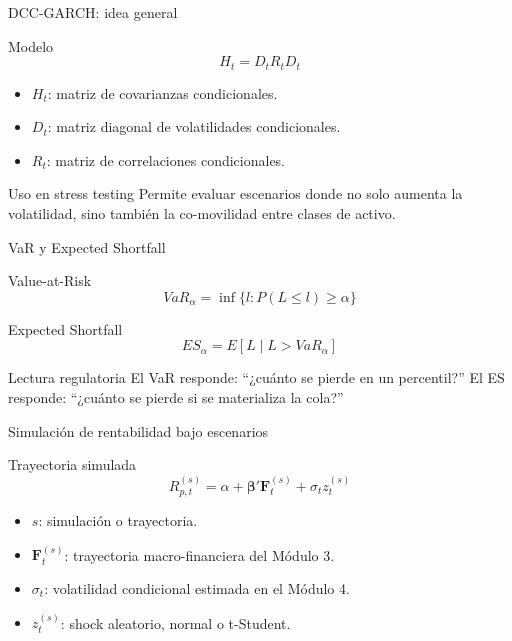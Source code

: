 \documentclass[aspectratio=169,11pt]{beamer}
\begin{document}
\begin{frame}{DCC-GARCH: idea general}
\begin{block}{Modelo}
\[
H_t=D_t R_t D_t
\]
\end{block}

\begin{itemize}
  \item $H_t$: matriz de covarianzas condicionales.
  \item $D_t$: matriz diagonal de volatilidades condicionales.
  \item $R_t$: matriz de correlaciones condicionales.
\end{itemize}

\begin{block}{Uso en stress testing}
Permite evaluar escenarios donde no solo aumenta la volatilidad, sino también la co-movilidad entre clases de activo.
\end{block}
\end{frame}

\begin{frame}{VaR y Expected Shortfall}
\begin{block}{Value-at-Risk}
\[
VaR_{\alpha}=\inf\{l: P(L\leq l)\geq \alpha\}
\]
\end{block}

\begin{block}{Expected Shortfall}
\[
ES_{\alpha}=E[L \mid L>VaR_{\alpha}]
\]
\end{block}

\begin{alertblock}{Lectura regulatoria}
El VaR responde: ``¿cuánto se pierde en un percentil?'' El ES responde: ``¿cuánto se pierde si se materializa la cola?''
\end{alertblock}
\end{frame}

\begin{frame}{Simulación de rentabilidad bajo escenarios}
\begin{block}{Trayectoria simulada}
\[
R_{p,t}^{(s)}=\alpha+\bm{\beta}'\bm{F}_{t}^{(s)}+\sigma_t z_t^{(s)}
\]
\end{block}

\begin{itemize}
  \item $s$: simulación o trayectoria.
  \item $\bm{F}_{t}^{(s)}$: trayectoria macro-financiera del Módulo 3.
  \item $\sigma_t$: volatilidad condicional estimada en el Módulo 4.
  \item $z_t^{(s)}$: shock aleatorio, normal o t-Student.
\end{itemize}
\end{frame}
\end{document}
